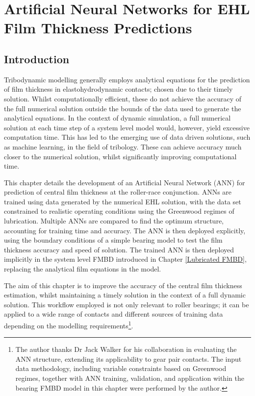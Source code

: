 \chapter{Artificial Neural Networks for EHL Film Thickness Predictions}
\label{ANN Lubricated Bearing FMBD}

\section{Introduction}

Tribodynamic modelling generally employs analytical equations for the prediction of film thickness in elastohydrodynamic contacts; chosen due to their timely solution. Whilst computationally efficient, these do not achieve the accuracy of the full numerical solution outside the bounds of the data used to generate the analytical equations. In the context of dynamic simulation, a full numerical solution at each time step of a system level model would, however, yield excessive computation time. This has led to the emerging use of data driven solutions, such as machine learning, in the field of tribology. These can achieve accuracy much closer to the numerical solution, whilst significantly improving computational time.

This chapter details the development of an Artificial Neural Network (ANN) for prediction of central film thickness at the roller-race conjunction. ANNs are trained using data generated by the numerical EHL solution, with the data set constrained to realistic operating conditions using the Greenwood regimes of lubrication. Multiple ANNs are compared to find the optimum structure, accounting for training time and accuracy. The ANN is then deployed explicitly, using the boundary conditions of a simple bearing model to test the film thickness accuracy and speed of solution. The trained ANN is then deployed implicitly in the system level FMBD introduced in Chapter \ref{Lubricated FMBD}, replacing the analytical film equations in the model.

The aim of this chapter is to improve the accuracy of the central film thickness estimation, whilst maintaining a timely solution in the context of a full dynamic solution. This workflow employed is not only relevant to roller bearings; it can be applied to a wide range of contacts and different sources of training data depending on the modelling requirements\footnote[1]{The author thanks Dr Jack Walker for his collaboration in evaluating the ANN structure, extending its applicability to gear pair contacts. The input data methodology, including variable constraints based on Greenwood regimes, together with ANN training, validation, and application within the bearing FMBD model in this chapter were performed by the author.}.

